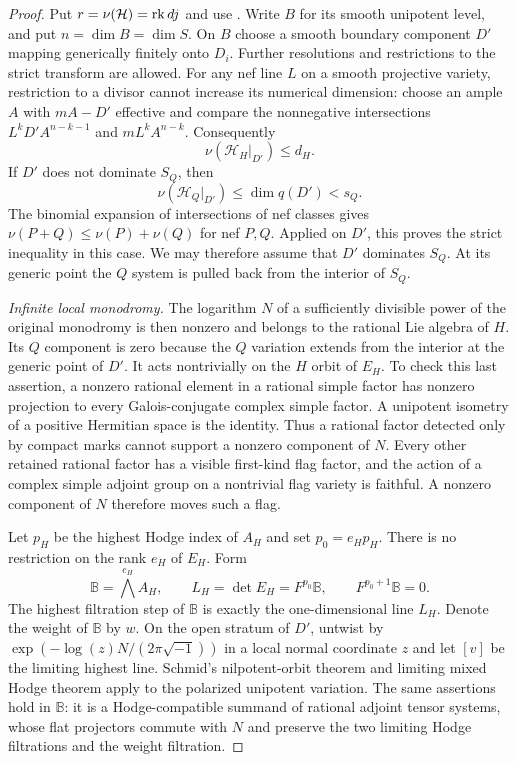 \begin{proof}
Put $r=\nu(\mathcal H)=\operatorname{rk} dj$ and use
.  Write $B$ for its smooth unipotent level,
and put $n=\dim B=\dim S$.  On $B$ choose a
smooth boundary component $D'$ mapping generically finitely onto
$D_i$.  Further resolutions and restrictions to the strict
transform are allowed.  For any nef line $L$ on a smooth
projective variety, restriction to a divisor cannot increase
its numerical dimension: choose an ample $A$ with $mA-D'$
effective and compare the nonnegative intersections
$L^kD'A^{n-k-1}$ and $mL^kA^{n-k}$.
Consequently
\[
                 \nu(\mathcal H_H|_{D'})\leq d_H.
\]
If $D'$ does not dominate $S_Q$, then
\[
 \nu(\mathcal H_Q|_{D'})\leq\dim q(D')<s_Q.
\]
The binomial expansion of intersections of nef classes gives
$\nu(P+Q)\leq\nu(P)+\nu(Q)$ for nef $P,Q$.  Applied on $D'$,
this proves the strict inequality in this case.  We may therefore
assume that $D'$ dominates $S_Q$.  At its generic point the
$Q$ system is pulled back from the interior of $S_Q$.

\smallskip\noindent
\emph{Infinite local monodromy.}
The logarithm $N$ of a sufficiently divisible power of the
original monodromy is then nonzero and belongs to the rational
Lie algebra of $H$.  Its $Q$ component is zero because the
$Q$ variation extends from the interior at the generic point
of $D'$.  It acts nontrivially on the $H$ orbit of $E_H$.
To check this last assertion, a nonzero rational element in
a rational simple factor has nonzero projection to every
Galois-conjugate complex simple factor.  A unipotent isometry
of a positive Hermitian space is the identity.  Thus a rational
factor detected only by compact marks cannot support a
nonzero component of $N$.  Every other retained rational factor
has a visible first-kind flag factor, and the action of a
complex simple adjoint group on a nontrivial flag variety is
faithful.  A nonzero component of $N$ therefore moves such a
flag.

Let $p_H$ be the highest Hodge index of $A_H$ and set $p_0=e_Hp_H$.
There is no restriction on the rank $e_H$ of $E_H$.  Form
\[
           \mathbb B=\bigwedge^{e_H}A_H,
           \qquad L_H=\det E_H=F^{p_0}\mathbb B,
           \qquad F^{p_0+1}\mathbb B=0.
\]
The highest filtration step of $\mathbb B$ is exactly the
one-dimensional line $L_H$.  Denote the weight of $\mathbb B$
by $w$.  On the open stratum of $D'$, untwist by
$\exp(-\log(z)N/(2\pi\sqrt{-1}))$ in a local normal coordinate
$z$ and let $[v]$ be the limiting highest line.  Schmid's
nilpotent-orbit theorem and limiting mixed Hodge theorem
\cite[Theorems~4.12 and~6.16]{Schmid} apply to the polarized
unipotent variation.  The same assertions hold in $\mathbb B$:
it is a Hodge-compatible summand of rational adjoint tensor
systems, whose flat projectors commute with $N$ and preserve
the two limiting Hodge filtrations and the weight filtration.


\end{proof}
